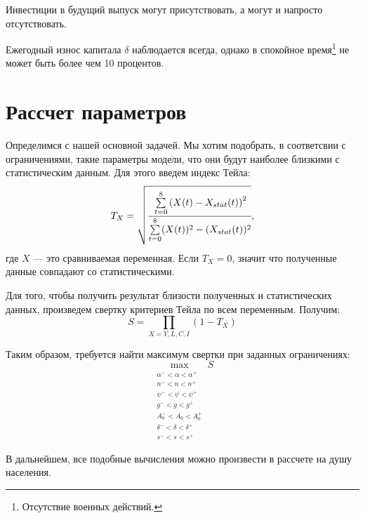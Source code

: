 Инвестиции в будущий выпуск могут присутствовать, а могут и напросто отсутствовать.

Ежегодный износ капитала $\delta$ наблюдается всегда, однако в спокойное время\footnote{Отсутствие военных действий.} не может быть более чем 10 процентов.

\section{Рассчет параметров}

Определимся с нашей основной задачей.
Мы хотим подобрать, в соответсвии с ограничениями, такие параметры модели, что они будут наиболее близкими с статистическим данным.
Для этого введем индекс Тейла:
\begin{equation*}
	T_{X} = \sqrt{\cfrac{\sum\limits_{t = 0}^{8}\left(X(t) - X_{stat}(t)\right)^2}{\sum\limits_{t = 0}^{8}(X(t))^2 - (X_{stat}(t))^2}}\text{,}
\end{equation*}
где $X$ --- это сравниваемая переменная.
Если $T_{X} = 0$, значит что полученные данные совпадают со статистическими.

Для того, чтобы получить результат близости полученных и статистических данных, произведем свертку критериев Тейла по всем переменным.
Получим:
\begin{equation*}
S=\prod\limits_{X=Y,L,C,I}\left(1 -T_{X}\right)
\end{equation*}

Таким образом, требуется найти максимум свертки при заданных ограничениях:
\begin{equation*}
\max_{\substack{\alpha^- < \alpha < \alpha^+ \\ n^- < n < n^+ \\ \psi^- < \psi < \psi^+ \\ g^- < g < g^+ \\ A_0^- < A_0 < A_0^+ \\ \delta^- < \delta < \delta^+\\ s^- < s < s^+}} S
\end{equation*}

В дальнейшем, все подобные вычисления можно произвести в рассчете на душу населения.
